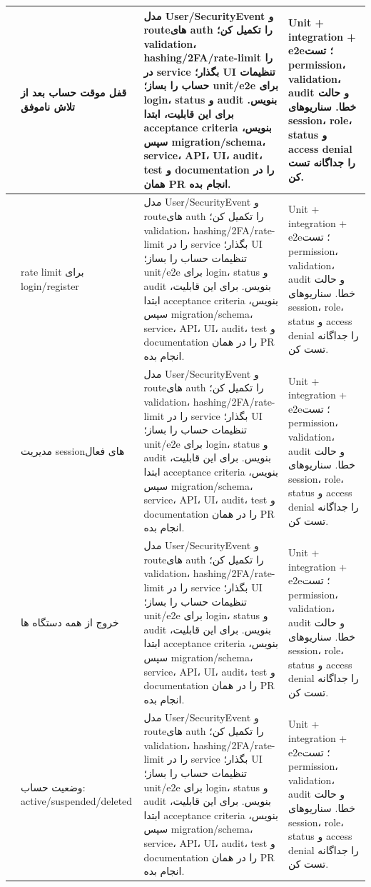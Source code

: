\documentclass[11pt,a4paper]{article}
\begin{document}
\begin{longtable}{|>{\raggedleft\arraybackslash}p{}|>{\raggedleft\arraybackslash}p{}|>{\raggedleft\arraybackslash}p{}|>{\raggedleft\arraybackslash}p{}|}
10 & قفل موقت حساب بعد از تلاش ناموفق & مدل User/SecurityEvent و routeهای auth را تکمیل کن؛ validation، hashing/2FA/rate-limit را در service بگذار؛ UI تنظیمات حساب را بساز؛ unit/e2e برای login، status و audit بنویس. برای این قابلیت، ابتدا acceptance criteria بنویس، سپس migration/schema، service، API، UI، audit، test و documentation را در همان PR انجام بده. & Unit + integration + e2e؛ تست permission، validation، audit و حالت خطا. سناریوهای session، role، status و access denial را جداگانه تست کن. \\ \hline
11 & rate limit برای login/register & مدل User/SecurityEvent و routeهای auth را تکمیل کن؛ validation، hashing/2FA/rate-limit را در service بگذار؛ UI تنظیمات حساب را بساز؛ unit/e2e برای login، status و audit بنویس. برای این قابلیت، ابتدا acceptance criteria بنویس، سپس migration/schema، service، API، UI، audit، test و documentation را در همان PR انجام بده. & Unit + integration + e2e؛ تست permission، validation، audit و حالت خطا. سناریوهای session، role، status و access denial را جداگانه تست کن. \\ \hline
12 & مدیریت sessionهای فعال & مدل User/SecurityEvent و routeهای auth را تکمیل کن؛ validation، hashing/2FA/rate-limit را در service بگذار؛ UI تنظیمات حساب را بساز؛ unit/e2e برای login، status و audit بنویس. برای این قابلیت، ابتدا acceptance criteria بنویس، سپس migration/schema، service، API، UI، audit، test و documentation را در همان PR انجام بده. & Unit + integration + e2e؛ تست permission، validation، audit و حالت خطا. سناریوهای session، role، status و access denial را جداگانه تست کن. \\ \hline
13 & خروج از همه دستگاه ها & مدل User/SecurityEvent و routeهای auth را تکمیل کن؛ validation، hashing/2FA/rate-limit را در service بگذار؛ UI تنظیمات حساب را بساز؛ unit/e2e برای login، status و audit بنویس. برای این قابلیت، ابتدا acceptance criteria بنویس، سپس migration/schema، service، API، UI، audit، test و documentation را در همان PR انجام بده. & Unit + integration + e2e؛ تست permission، validation، audit و حالت خطا. سناریوهای session، role، status و access denial را جداگانه تست کن. \\ \hline
14 & وضعیت حساب: active/suspended/deleted & مدل User/SecurityEvent و routeهای auth را تکمیل کن؛ validation، hashing/2FA/rate-limit را در service بگذار؛ UI تنظیمات حساب را بساز؛ unit/e2e برای login، status و audit بنویس. برای این قابلیت، ابتدا acceptance criteria بنویس، سپس migration/schema، service، API، UI، audit، test و documentation را در همان PR انجام بده. & Unit + integration + e2e؛ تست permission، validation، audit و حالت خطا. سناریوهای session، role، status و access denial را جداگانه تست کن. \\ \hline

\end{longtable}
\end{document}
